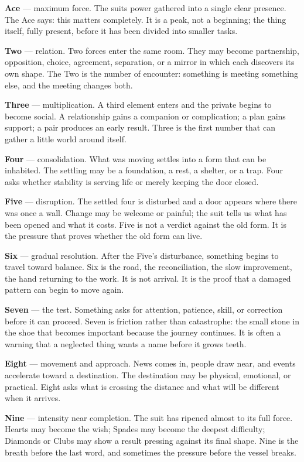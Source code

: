 \textbf{Ace} --- maximum force. The suit\textquotesingle s power gathered into a
single clear presence. The Ace says: this matters completely. It is a peak, not
a beginning; the thing itself, fully present, before it has been divided into
smaller tasks.

\textbf{Two} --- relation. Two forces enter the same room. They may become
partnership, opposition, choice, agreement, separation, or a mirror in which
each discovers its own shape. The Two is the number of encounter: something is
meeting something else, and the meeting changes both.

\textbf{Three} --- multiplication. A third element enters and the private begins
to become social. A relationship gains a companion or complication; a plan
gains support; a pair produces an early result. Three is the first number that
can gather a little world around itself.

\textbf{Four} --- consolidation. What was moving settles into a form that can be
inhabited. The settling may be a foundation, a rest, a shelter, or a trap. Four
asks whether stability is serving life or merely keeping the door closed.

\textbf{Five} --- disruption. The settled four is disturbed and a door appears
where there was once a wall. Change may be welcome or painful; the suit tells us
what has been opened and what it costs. Five is not a verdict against the old
form. It is the pressure that proves whether the old form can live.

\textbf{Six} --- gradual resolution. After the Five's disturbance, something
begins to travel toward balance. Six is the road, the reconciliation, the slow
improvement, the hand returning to the work. It is not arrival. It is the proof
that a damaged pattern can begin to move again.

\textbf{Seven} --- the test. Something asks for attention, patience, skill, or
correction before it can proceed. Seven is friction rather than catastrophe: the
small stone in the shoe that becomes important because the journey continues.
It is often a warning that a neglected thing wants a name before it grows teeth.

\textbf{Eight} --- movement and approach. News comes in, people draw near, and
events accelerate toward a destination. The destination may be physical,
emotional, or practical. Eight asks what is crossing the distance and what will
be different when it arrives.

\textbf{Nine} --- intensity near completion. The suit has ripened almost to its
full force. Hearts may become the wish; Spades may become the deepest difficulty;
Diamonds or Clubs may show a result pressing against its final shape. Nine is the
breath before the last word, and sometimes the pressure before the vessel breaks.

